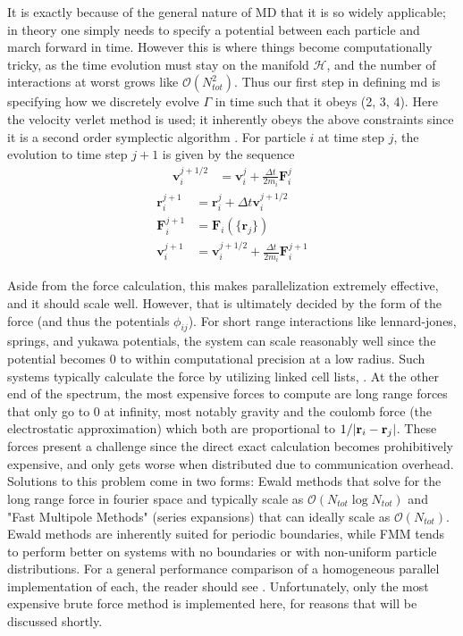 \documentclass[%
 reprint,
 amsmath,amssymb,
 aps,
pra,
prb,
rmp,
prstab,
prstper,
]{revtex4-1}
\newcommand{\haml}{\mathcal{H}}
\newcommand{\vc}[1]{\mathbf{#1}}
\begin{document}
It is exactly because of the general nature of MD that it is so widely applicable; 
in theory one simply needs to specify a potential between each particle and march
forward in time. However this is where things become computationally tricky, as the 
time evolution must stay on the manifold $\haml$, and the number of interactions 
at worst grows like $\mathcal{O}(N_{tot}^{2})$. Thus our first step in defining md
is specifying how we discretely evolve $\Gamma$ in time such that it obeys (2, 3, 4).
Here the velocity verlet method is used; it inherently obeys the above constraints since it is a second order symplectic algorithm
\cite{yoshida}. For particle $i$ at time step $j$, the evolution to time step $j+1$
is given by the sequence
\begin{align}
\vc{v}^{j+1/2}_{i} &= \vc{v}^{j}_{i} + \frac{\Delta t}{2m_{i}}\vc{F}^{j}_{i}
\end{align}
\begin{align*}
\vc{r}^{j+1}_{i} &= \vc{r}^{j}_{i} + \Delta t \vc{v}^{j+1/2}_{i}\\
\vc{F}^{j+1}_{i} &= \vc{F}_{i}(\{\vc{r}_{j}\})\\
\vc{v}^{j+1}_{i} &= \vc{v}^{j+1/2}_{i} + \frac{\Delta t}{2m_{i}}\vc{F}^{j+1}_{i}
\end{align*}

Aside from the force calculation, this makes parallelization extremely effective,
and it should scale well. However, that is ultimately decided by the form of the
force (and thus the potentials $\phi_{ij}$). For short range interactions like
lennard-jones, springs, and yukawa potentials, the system can scale reasonably well
since the potential becomes 0 to within computational precision at a low radius. Such 
systems typically calculate the force by utilizing linked cell lists\cite{gonnet_2012}, 
\cite{mattson_1999}. At the other end of the spectrum, the most expensive forces to
compute are long range forces that only go to 0 at infinity, most notably gravity
and the coulomb force (the electrostatic approximation) which both are proportional
to $1/\abs{\vc{r}_{i}-\vc{r}_{j}}$. These forces present a challenge since the direct
exact calculation becomes prohibitively expensive, and only gets worse when
distributed due to communication overhead. Solutions to this problem come in
two forms: Ewald methods that solve for the long range force in fourier space
\cite{hockney}\cite{deserno_1998}
and typically scale as $\mathcal{O}(N_{tot}\log N_{tot})$ and 
"Fast Multipole Methods" (series expansions) 
\cite{greengard_1987}\cite{kurzak_2006}that can ideally scale as
$\mathcal{O}(N_{tot})$. Ewald methods are inherently suited for periodic boundaries,
while FMM tends to perform better on systems with no boundaries or with non-uniform
particle distributions. For a general performance comparison of a homogeneous parallel implementation of each, the reader should see \cite{arnold_2013}. Unfortunately, only
the most expensive brute force method is implemented here,  for reasons that will be discussed shortly. 
\end{document}
